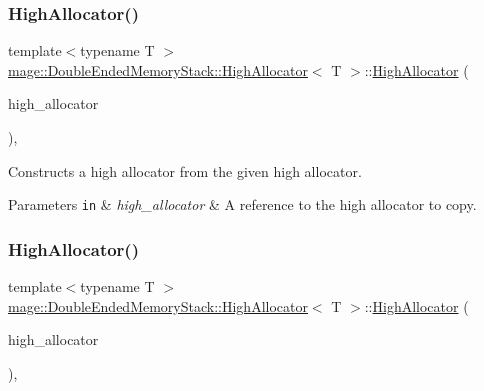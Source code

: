 \subsubsection{\texorpdfstring{High\+Allocator()}{HighAllocator()}\hspace{0.1cm}{\footnotesize\ttfamily [1/4]}}
{\footnotesize\ttfamily template$<$typename T $>$ \\
\mbox{\hyperlink{classmage_1_1_double_ended_memory_stack_1_1_high_allocator}{mage\+::\+Double\+Ended\+Memory\+Stack\+::\+High\+Allocator}}$<$ T $>$\+::\mbox{\hyperlink{classmage_1_1_double_ended_memory_stack_1_1_high_allocator}{High\+Allocator}} (\begin{DoxyParamCaption}\item[{const \mbox{\hyperlink{classmage_1_1_double_ended_memory_stack_1_1_high_allocator}{High\+Allocator}}$<$ T $>$ \&}]{high\+\_\+allocator }\end{DoxyParamCaption})\hspace{0.3cm}{\ttfamily [default]}, {\ttfamily [noexcept]}}

Constructs a high allocator from the given high allocator.


\begin{DoxyParams}[1]{Parameters}
\mbox{\tt in}  & {\em high\+\_\+allocator} & A reference to the high allocator to copy. \\
\hline
\end{DoxyParams}
\mbox{\label{classmage_1_1_double_ended_memory_stack_1_1_high_allocator_a4d7cf78e9d279f91bc2247a1dcbbccd6}} 
\subsubsection{\texorpdfstring{High\+Allocator()}{HighAllocator()}\hspace{0.1cm}{\footnotesize\ttfamily [2/4]}}
{\footnotesize\ttfamily template$<$typename T $>$ \\
\mbox{\hyperlink{classmage_1_1_double_ended_memory_stack_1_1_high_allocator}{mage\+::\+Double\+Ended\+Memory\+Stack\+::\+High\+Allocator}}$<$ T $>$\+::\mbox{\hyperlink{classmage_1_1_double_ended_memory_stack_1_1_high_allocator}{High\+Allocator}} (\begin{DoxyParamCaption}\item[{\mbox{\hyperlink{classmage_1_1_double_ended_memory_stack_1_1_high_allocator}{High\+Allocator}}$<$ T $>$ \&\&}]{high\+\_\+allocator }\end{DoxyParamCaption})\hspace{0.3cm}{\ttfamily [default]}, {\ttfamily [noexcept]}}


